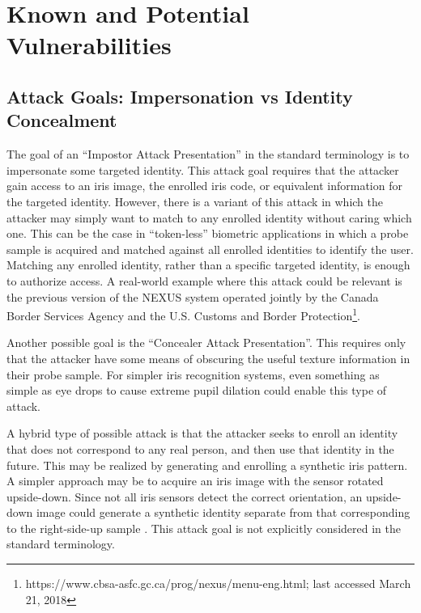 \documentclass[format=acmsmall, review=false, timestamp=false]{acmart}
\begin{document}
\section{Known and Potential Vulnerabilities}
\label{sec:KnownVulnerabilities}


\subsection{Attack Goals: Impersonation vs Identity Concealment}
\label{sec:KnownVulnerabilities_Impersonation_vs_Concealment}

The goal of an ``Impostor Attack Presentation'' in the standard terminology is to impersonate some targeted identity. {T}his attack goal requires that the attacker gain access to an iris image, the enrolled iris code, or equivalent information for the targeted identity. However, there is a variant of this attack in which the attacker may simply want to match to any enrolled identity without caring which one. This can be the case in ``token-less'' biometric applications in which a probe sample is acquired and matched against all enrolled identities to identify the user. Matching any enrolled identity, rather than a specific targeted identity, is enough to authorize access. A real-world example where this attack could be relevant is the previous version of the NEXUS system operated jointly by the Canada Border Services Agency and the U.S. Customs and Border Protection\footnote{https://www.cbsa-asfc.gc.ca/prog/nexus/menu-eng.html; last accessed March 21, 2018}.

Another possible goal is the ``Concealer Attack Presentation''. This requires only that the attacker have some means of obscuring the useful texture information in their probe sample. For simpler iris recognition systems, even something as simple as eye drops to cause extreme pupil dilation could enable this type of attack.

A hybrid type of possible attack is that the attacker seeks to enroll an identity that does not correspond to any real person, and then use that identity in the future. This may be realized by generating and enrolling a synthetic iris pattern. {A} simpler approach may be to acquire an iris image with the sensor rotated upside-down. Since not all iris sensors detect the correct orientation, an upside-down image could generate a synthetic identity separate from that corresponding to the right-side-up sample \cite{Czajka_TIFS_2017}. This attack goal is not explicitly considered in the standard terminology.
\end{document}
